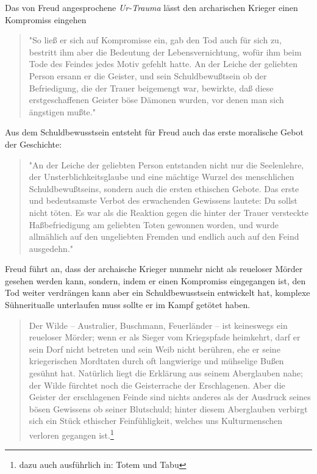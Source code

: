\documentclass[11pt,a4paper,oneside,numbers=noenddot,bibliography=totocnumbered,DIV=13]{scrartcl}
\begin{document}
{%
Das von Freud angesprochene \textit{Ur-Trauma} lässt den archarischen Krieger einen Kompromiss eingehen
\begin{quote}
"So ließ er sich auf Kompromisse ein, gab den Tod auch für sich zu, bestritt ihm aber die Bedeutung der Lebensvernichtung, wofür ihm beim Tode des Feindes jedes Motiv gefehlt hatte. An der Leiche der geliebten Person ersann er die Geister, und sein Schuldbewußtsein ob der Befriedigung, die der Trauer beigemengt war, bewirkte, daß diese erstgeschaffenen Geister böse Dämonen wurden, vor denen man sich ängstigen mußte." 
\end{quote}
Aus dem Schuldbewusstsein entsteht für Freud auch das erste moralische Gebot der Geschichte:
\begin{quote}
"An der Leiche der geliebten Person entstanden nicht nur die Seelenlehre, der Unsterblichkeitsglaube und eine mächtige Wurzel des menschlichen Schuldbewußtseins, sondern auch die ersten ethischen Gebote. Das erste und bedeutsamste Verbot des erwachenden Gewissens lautete: Du sollst nicht töten. Es war als die Reaktion gegen die hinter der Trauer versteckte Haßbefriedigung am geliebten Toten gewonnen worden, und wurde allmählich auf den ungeliebten Fremden und endlich auch auf den Feind ausgedehn." 
\end{quote}
Freud führt an, dass der archaische Krieger nunmehr nicht als reueloser Mörder gesehen werden kann, sondern, indem er einen Kompromiss eingegangen ist, den Tod weiter verdrängen kann aber ein Schuldbewusstsein entwickelt hat, komplexe Sühneritualle unterlaufen muss sollte er im Kampf getötet haben.
\begin{quote} \glqq
Der Wilde – Australier, Buschmann, Feuerländer – ist keineswegs ein reueloser Mörder; wenn er als Sieger vom Kriegspfade heimkehrt, darf er sein Dorf nicht betreten und sein Weib nicht berühren, ehe er seine kriegerischen Mordtaten durch oft langwierige und mühselige Bußen gesühnt hat. Natürlich liegt die Erklärung aus seinem Aberglauben nahe; der Wilde fürchtet noch die Geisterrache der Erschlagenen. Aber die Geister der erschlagenen Feinde sind nichts anderes als der Ausdruck seines bösen Gewissens ob seiner Blutschuld; hinter diesem Aberglauben verbirgt sich ein Stück ethischer Feinfühligkeit, welches uns Kulturmenschen verloren gegangen ist.\footnote{dazu auch ausführlich in: \glqq Totem und Tabu \grqq}
\grqq
\end{quote}

}
\end{document}
